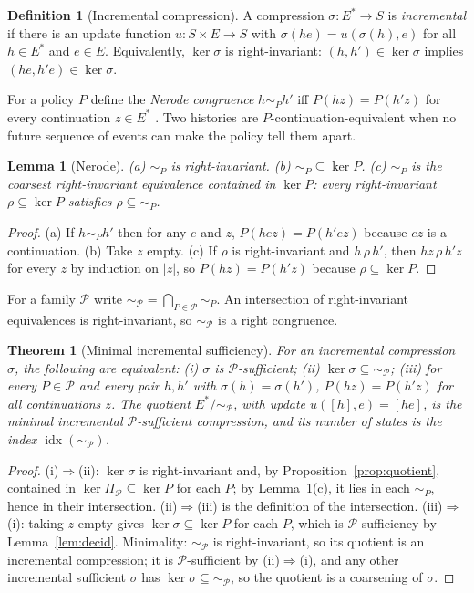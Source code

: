 \documentclass[11pt]{article}
\newtheorem{theorem}{Theorem}
\newtheorem{lemma}{Lemma}
\theoremstyle{definition}
\newtheorem{definition}{Definition}
\theoremstyle{remark}
\newcommand{\Ev}{E}
\newcommand{\Pol}{\mathcal{P}}
\newcommand{\nerode}[1]{\sim_{#1}}
\newcommand{\idx}{\operatorname{idx}}
\begin{document}
\begin{definition}[Incremental compression]
A compression $\sigma:\Ev^{*}\to S$ is \emph{incremental} if there is an update function $u:S\times\Ev\to S$ with $\sigma(he)=u(\sigma(h),e)$ for all $h\in\Ev^{*}$ and $e\in\Ev$. Equivalently, $\ker\sigma$ is right-invariant: $(h,h')\in\ker\sigma$ implies $(he,h'e)\in\ker\sigma$.
\end{definition}

For a policy $P$ define the \emph{Nerode congruence} $h\nerode{P}h'$ iff $P(hz)=P(h'z)$ for every continuation $z\in\Ev^{*}$ \cite{myhill,nerode}. Two histories are $P$-continuation-equivalent when no future sequence of events can make the policy tell them apart.

\begin{lemma}[Nerode]\label{lem:nerode}
(a) $\nerode{P}$ is right-invariant. (b) $\nerode{P}\subseteq\ker P$. (c) $\nerode{P}$ is the coarsest right-invariant equivalence contained in $\ker P$: every right-invariant $\rho\subseteq\ker P$ satisfies $\rho\subseteq\nerode{P}$.
\end{lemma}

\begin{proof}
(a) If $h\nerode{P}h'$ then for any $e$ and $z$, $P(hez)=P(h'ez)$ because $ez$ is a continuation. (b) Take $z$ empty. (c) If $\rho$ is right-invariant and $h\,\rho\,h'$, then $hz\,\rho\,h'z$ for every $z$ by induction on $|z|$, so $P(hz)=P(h'z)$ because $\rho\subseteq\ker P$.
\end{proof}

For a family $\Pol$ write $\nerode{\Pol}=\bigcap_{P\in\Pol}\nerode{P}$. An intersection of right-invariant equivalences is right-invariant, so $\nerode{\Pol}$ is a right congruence.

\begin{theorem}[Minimal incremental sufficiency]\label{thm:incremental}
For an incremental compression $\sigma$, the following are equivalent: (i) $\sigma$ is $\Pol$-sufficient; (ii) $\ker\sigma\subseteq\nerode{\Pol}$; (iii) for every $P\in\Pol$ and every pair $h,h'$ with $\sigma(h)=\sigma(h')$, $P(hz)=P(h'z)$ for all continuations $z$. The quotient $\Ev^{*}/{\nerode{\Pol}}$, with update $u([h],e)=[he]$, is the minimal incremental $\Pol$-sufficient compression, and its number of states is the index $\idx(\nerode{\Pol})$.
\end{theorem}

\begin{proof}
(i)$\Rightarrow$(ii): $\ker\sigma$ is right-invariant and, by Proposition~\ref{prop:quotient}, contained in $\ker\Pi_\Pol\subseteq\ker P$ for each $P$; by Lemma~\ref{lem:nerode}(c), it lies in each $\nerode{P}$, hence in their intersection. (ii)$\Rightarrow$(iii) is the definition of the intersection. (iii)$\Rightarrow$(i): taking $z$ empty gives $\ker\sigma\subseteq\ker P$ for each $P$, which is $\Pol$-sufficiency by Lemma~\ref{lem:decid}. Minimality: $\nerode{\Pol}$ is right-invariant, so its quotient is an incremental compression; it is $\Pol$-sufficient by (ii)$\Rightarrow$(i), and any other incremental sufficient $\sigma$ has $\ker\sigma\subseteq\nerode{\Pol}$, so the quotient is a coarsening of $\sigma$.
\end{proof}
\end{document}
